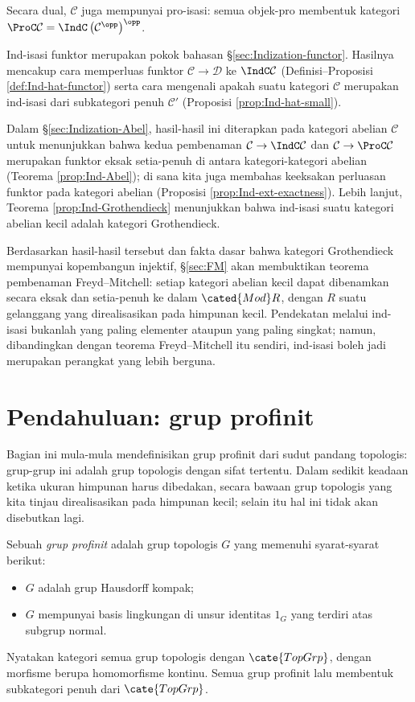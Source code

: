 Secara dual, $\mathcal{C}$ juga mempunyai pro-isasi: semua objek-pro membentuk kategori $\ProC\mathcal{C} = \IndC\left(\mathcal{C}^{\opp}\right)^{\opp}$.

Ind-isasi funktor merupakan pokok bahasan \S\ref{sec:Indization-functor}. Hasilnya mencakup cara memperluas funktor $\mathcal{C} \to \mathcal{D}$ ke $\IndC\mathcal{C}$ (Definisi--Proposisi \ref{def:Ind-hat-functor}) serta cara mengenali apakah suatu kategori $\mathcal{C}$ merupakan ind-isasi dari subkategori penuh $\mathcal{C}'$ (Proposisi \ref{prop:Ind-hat-small}).

Dalam \S\ref{sec:Indization-Abel}, hasil-hasil ini diterapkan pada kategori abelian $\mathcal{C}$ untuk menunjukkan bahwa kedua pembenaman $\mathcal{C} \to \IndC\mathcal{C}$ dan $\mathcal{C} \to \ProC\mathcal{C}$ merupakan funktor eksak setia-penuh di antara kategori-kategori abelian (Teorema \ref{prop:Ind-Abel}); di sana kita juga membahas keeksakan perluasan funktor pada kategori abelian (Proposisi \ref{prop:Ind-ext-exactness}). Lebih lanjut, Teorema \ref{prop:Ind-Grothendieck} menunjukkan bahwa ind-isasi suatu kategori abelian kecil adalah kategori Grothendieck.

Berdasarkan hasil-hasil tersebut dan fakta dasar bahwa kategori Grothendieck mempunyai kopembangun injektif, \S\ref{sec:FM} akan membuktikan teorema pembenaman Freyd--Mitchell: setiap kategori abelian kecil dapat dibenamkan secara eksak dan setia-penuh ke dalam $\cated{Mod}R$, dengan $R$ suatu gelanggang yang direalisasikan pada himpunan kecil. Pendekatan melalui ind-isasi bukanlah yang paling elementer ataupun yang paling singkat; namun, dibandingkan dengan teorema Freyd--Mitchell itu sendiri, ind-isasi boleh jadi merupakan perangkat yang lebih berguna.

\section{Pendahuluan: grup profinit}\label{sec:profinite-groups}
Bagian ini mula-mula mendefinisikan grup profinit dari sudut pandang topologis: grup-grup ini adalah grup topologis dengan sifat tertentu. Dalam sedikit keadaan ketika ukuran himpunan harus dibedakan, secara bawaan grup topologis yang kita tinjau direalisasikan pada himpunan kecil; selain itu hal ini tidak akan disebutkan lagi.

\begin{definition}\label{def:profinite-group}
	Sebuah \emph{grup profinit} adalah grup topologis $G$ yang memenuhi syarat-syarat berikut:
	\begin{itemize}
		\item $G$ adalah grup Hausdorff kompak;
		\item $G$ mempunyai basis lingkungan di unsur identitas $1_G$ yang terdiri atas subgrup normal.
	\end{itemize}
	
	Nyatakan kategori semua grup topologis dengan $\cate{TopGrp}$, dengan morfisme berupa homomorfisme kontinu. Semua grup profinit lalu membentuk subkategori penuh dari $\cate{TopGrp}$.
\end{definition}

